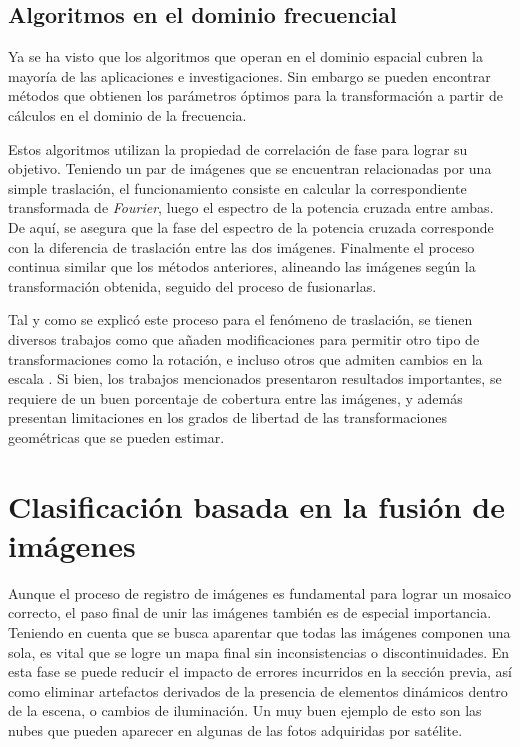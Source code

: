 \subsection*{Algoritmos en el dominio frecuencial}

Ya se ha visto que los algoritmos que operan en el dominio espacial cubren la mayoría de las aplicaciones e investigaciones. Sin embargo se pueden encontrar métodos que obtienen los parámetros óptimos para la transformación a partir de cálculos en el dominio de la frecuencia. 

Estos algoritmos utilizan la propiedad de correlación de fase para lograr su objetivo. Teniendo un par de imágenes que se encuentran relacionadas por una simple traslación, el funcionamiento consiste en calcular la correspondiente transformada de \textit{Fourier}, luego el espectro de la potencia cruzada entre ambas. De aquí, se asegura que la fase del espectro de la potencia cruzada corresponde con la diferencia de traslación entre las dos imágenes. Finalmente el proceso continua similar que los métodos anteriores, alineando las imágenes según la transformación obtenida, seguido del proceso de fusionarlas.

Tal y como se explicó este proceso para el fenómeno de traslación, se tienen diversos trabajos como \cite{phase-rot} que añaden modificaciones para permitir otro tipo de transformaciones como la rotación, e incluso otros que admiten cambios en la escala \cite{phase-scale}. Si bien, los trabajos mencionados presentaron resultados importantes, se requiere de un buen porcentaje de cobertura entre las imágenes, y además presentan limitaciones en los grados de libertad de las transformaciones geométricas que se pueden estimar.


\section*{Clasificación basada en la fusión de imágenes}

Aunque el proceso de registro de imágenes es fundamental para lograr un mosaico correcto, el paso final de unir las imágenes también es de especial importancia. Teniendo en cuenta que se busca aparentar que todas las imágenes componen una sola, es vital que se logre un mapa final sin inconsistencias o discontinuidades. En esta fase se puede reducir el impacto de errores incurridos en la sección previa, así como eliminar artefactos derivados de la presencia de elementos dinámicos dentro de la escena, o cambios de iluminación. Un muy buen ejemplo de esto son las nubes que pueden aparecer en algunas de las fotos adquiridas por satélite.

